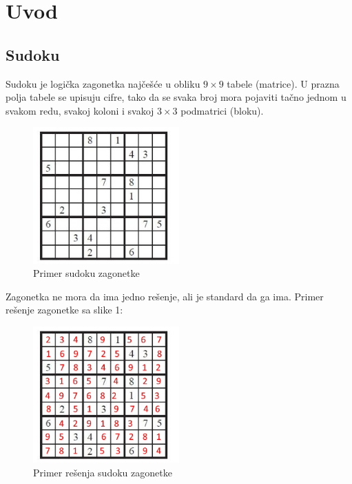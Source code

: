 \documentclass[a4paper]{article}
\begin{document}
    
    
    
    \section{Uvod}
    \subsection{Sudoku}
    Sudoku je logička zagonetka najčešće u obliku $9 \times 9$ tabele (matrice).
    U prazna polja tabele se upisuju cifre, tako da se svaka broj mora pojaviti
    tačno jednom u svakom redu, svakoj koloni i svakoj $3\times 3$ podmatrici (bloku).
    \begin{figure}[h]
        \centering
        \includegraphics[width=0.5\textwidth, height=0.5\textwidth]{img/sudoku-example.jpg}
        \caption{Primer sudoku zagonetke}
    \end{figure}
    \par Zagonetka ne mora da ima jedno rešenje, ali je standard da ga ima. Primer rešenje zagonetke sa slike 1:
    \begin{figure}[h]
        \centering
        \includegraphics[width=0.5\textwidth, height=0.5\textwidth]{img/sudoku-example-sol.jpg}
        \caption{Primer rešenja sudoku zagonetke}
    \end{figure}
\end{document}
